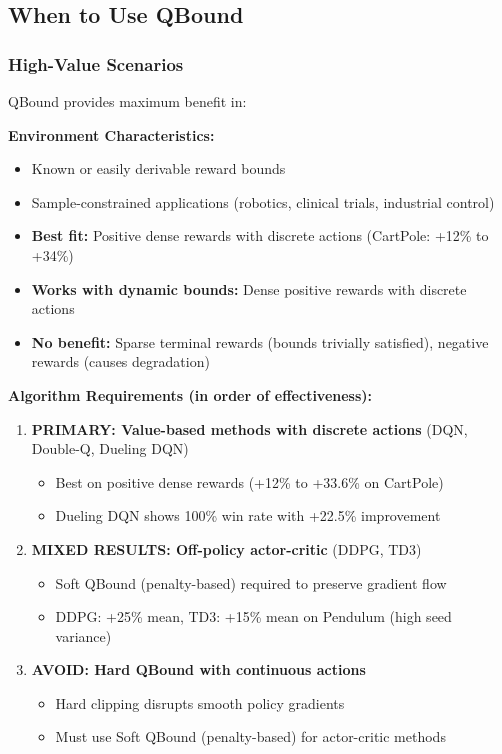 \documentclass[11pt]{article}
\theoremstyle{definition}
\theoremstyle{remark}
\begin{document}
\subsection{When to Use QBound}

\subsubsection{High-Value Scenarios}

QBound provides maximum benefit in:

\textbf{Environment Characteristics:}
\begin{itemize}
    \item Known or easily derivable reward bounds
    \item Sample-constrained applications (robotics, clinical trials, industrial control)
    \item \textbf{Best fit:} Positive dense rewards with discrete actions (CartPole: +12\% to +34\%)
    \item \textbf{Works with dynamic bounds:} Dense positive rewards with discrete actions
    \item \textbf{No benefit:} Sparse terminal rewards (bounds trivially satisfied), negative rewards (causes degradation)
\end{itemize}

\textbf{Algorithm Requirements (in order of effectiveness):}
\begin{enumerate}
    \item \textbf{PRIMARY: Value-based methods with discrete actions} (DQN, Double-Q, Dueling DQN)
        \begin{itemize}
            \item Best on positive dense rewards (+12\% to +33.6\% on CartPole)
            \item Dueling DQN shows 100\% win rate with +22.5\% improvement
        \end{itemize}
    \item \textbf{MIXED RESULTS: Off-policy actor-critic} (DDPG, TD3)
        \begin{itemize}
            \item Soft QBound (penalty-based) required to preserve gradient flow
            \item DDPG: +25\% mean, TD3: +15\% mean on Pendulum (high seed variance)
        \end{itemize}
    \item \textbf{AVOID: Hard QBound with continuous actions}
        \begin{itemize}
            \item Hard clipping disrupts smooth policy gradients
            \item Must use Soft QBound (penalty-based) for actor-critic methods
        \end{itemize}
\end{enumerate}
\end{document}
